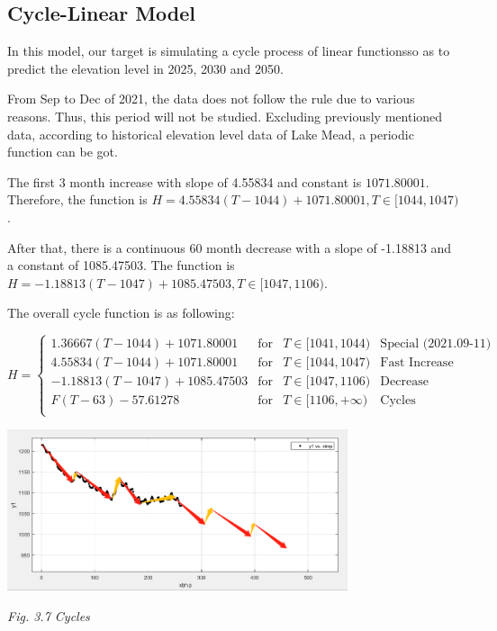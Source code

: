 \documentclass[12pt]{article}
\theoremstyle{definition}
\theoremstyle{remark}
\numberwithin{equation}{section}
\begin{document}
	\subsection{Cycle-Linear Model}

		In this model, our target is simulating a cycle process of linear functionsso as to predict the elevation level in 2025, 2030 and 2050.

		From Sep to Dec of 2021, the data does not follow the rule due to various reasons. Thus, this period will not be studied. Excluding previously mentioned data, according to historical elevation level data of Lake Mead, a periodic function can be got. 
			
		The first 3 month increase with slope of 4.55834 and constant is $1071.80001$. Therefore, the function is $H = 4.55834(T-1044)+1071.80001, T \in [1044, 1047)$.

		After that, there is a continuous 60 month decrease with a slope of -1.18813 and a constant of 1085.47503. The function is $H = -1.18813(T-1047)+1085.47503, T \in [1047, 1106)$.

		The overall cycle function is as following:

		$$H =
		\left\{
		\begin{array}{rclr}
		1.36667(T-1044)+1071.80001& \text{for} &T\in[1041,1044) & \text{Special (2021.09-11)}\\
		4.55834(T-1044)+1071.80001& \text{for} &T\in[1044,1047) & \text{Fast Increase}\\
		-1.18813(T-1047)+1085.47503& \text{for} &T\in[1047,1106) & \text{Decrease}\\
		F(T-63)-57.61278& \text{for} &T\in[1106, +\infty) & \text{Cycles}\\
		\end{array}
		\right.$$

		\begin{center}
			\includegraphics[width=10cm]{3.7 Cycles.png}
			
			\small \textit{Fig. 3.7 Cycles}
		\end{center}
\end{document}
